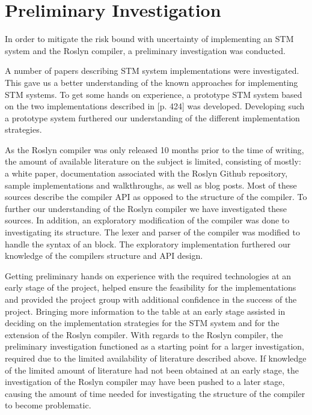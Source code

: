 \makeatletter {}\makeatother
{}
\label{chap:reflection}
\section{Preliminary Investigation}
In order to mitigate the risk bound with uncertainty of implementing an \ac{STM} system and the Roslyn compiler, a preliminary investigation was conducted. 

A number of papers describing \ac{STM} system implementations were investigated. This gave us a better understanding of the known approaches for implementing \ac{STM} systems. To get some hands on experience, a prototype \ac{STM} system based on the two implementations described in \cite{herlihy2012art}[p. 424] was developed. Developing such a prototype system furthered our understanding of the different implementation strategies.

As the Roslyn compiler was only released 10 months prior to the time of writing, the amount of available literature on the subject is limited, consisting of mostly: a white paper\cite{ng2012roslyn}, documentation associated with the Roslyn Github repository\cite{roslynwiki}, sample implementations and walkthroughs\cite{roslynsamples}, as well as blog posts. Most of these sources describe the compiler \ac{API} as opposed to the structure of the compiler. To further our understanding of the Roslyn compiler we have investigated these sources. In addition, an exploratory modification of the compiler was done to investigating its structure. The lexer and parser of the compiler was modified to handle the syntax of an  block. The exploratory implementation furthered our knowledge of the compilers structure and \ac{API} design.

Getting preliminary hands on experience with the required technologies at an early stage of the project, helped ensure the feasibility for the implementations and provided the project group with additional confidence in the success of the project. Bringing more information to the table at an early stage assisted in deciding on the implementation strategies for the \ac{STM} system and for the extension of the Roslyn compiler. With regards to the Roslyn compiler, the preliminary investigation functioned as a starting point for a larger investigation, required due to the limited availability of literature described above. If knowledge of the limited amount of literature had not been obtained at an early stage, the investigation of the Roslyn compiler may have been pushed to a later stage, causing the amount of time needed for investigating the structure of the compiler to become problematic.

